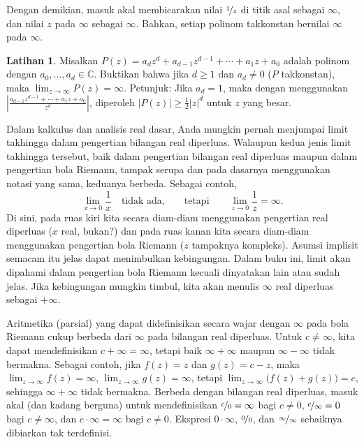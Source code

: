 \documentclass[12pt,openany]{book}
\newcommand{\sabs}[1]{\lvert {#1} \rvert}
\newcommand{\abs}[1]{\left\lvert {#1} \right\rvert}
\newcommand{\C}{{\mathbb{C}}}
\theoremstyle{plain}
\theoremstyle{remark}
\theoremstyle{definition}
\newenvironment{exbox}{%
    \def\FrameCommand{\vrule width 1pt \relax\hspace{10pt}}%
    \MakeFramed{\advance\hsize-\width\FrameRestore}%
}{%
    \endMakeFramed
}
\theoremstyle{exercise}
\newtheorem{exercise}{Latihan}[section]
\theoremstyle{example}
\begin{document}
Dengan demikian, masuk akal membicarakan nilai $\nicefrac{1}{z}$ di titik asal
sebagai $\infty$, dan nilai $z$ pada $\infty$ sebagai $\infty$.
Bahkan, setiap polinom takkonstan bernilai $\infty$ pada $\infty$.

\begin{exbox}
\begin{exercise}%
\label{exercise:polygoesinf}
Misalkan $P(z) = a_d z^d + a_{d-1} z^{d-1} + \cdots + a_1 z + a_0$ adalah
polinom dengan $a_0,\ldots,a_d \in \C$.  Buktikan bahwa jika $d \geq 1$
dan $a_d \neq 0$ ($P$ takkonstan),
maka $\lim_{z \to \infty} P(z) = \infty$.
Petunjuk: Jika $a_d = 1$, maka dengan menggunakan
$\abs{\frac{a_{d-1} z^{d-1} + \cdots + a_1 z + a_0}{z^d}}$, diperoleh
$\abs{P(z)} \geq \frac{1}{2} \sabs{z}^d$ untuk $z$ yang besar.
\end{exercise}
\end{exbox}

Dalam kalkulus dan analisis real dasar, Anda mungkin pernah menjumpai
limit takhingga dalam pengertian bilangan real diperluas.
Walaupun kedua jenis limit takhingga tersebut, baik dalam pengertian
bilangan real diperluas maupun dalam pengertian bola Riemann,
tampak serupa dan pada dasarnya menggunakan notasi yang sama,
keduanya berbeda.
Sebagai contoh,
\begin{equation*}
\lim_{x \to 0} \frac{1}{x} \quad \text{tidak ada,} \qquad \text{tetapi} \qquad
\lim_{z \to 0} \frac{1}{z} = \infty .
\end{equation*}
Di sini, pada ruas kiri kita secara diam-diam menggunakan pengertian real diperluas
($x$ real, bukan?) dan pada
ruas kanan kita secara diam-diam menggunakan pengertian bola Riemann ($z$ tampaknya kompleks).
Asumsi implisit semacam itu jelas dapat menimbulkan kebingungan.
Dalam buku ini, limit akan dipahami dalam pengertian bola Riemann
kecuali dinyatakan lain atau sudah jelas.
Jika kebingungan mungkin timbul, kita akan menulis $\infty$ real diperluas
sebagai $+\infty$.

\medskip

Aritmetika (parsial) yang dapat
didefinisikan secara wajar dengan $\infty$ pada bola Riemann
cukup berbeda dari
$\infty$ pada bilangan real diperluas.
Untuk $c \neq \infty$, kita dapat mendefinisikan $c+\infty = \infty$,
tetapi baik $\infty+\infty$ maupun $\infty-\infty$ tidak bermakna.
Sebagai contoh, jika $f(z) = z$ dan $g(z) = c-z$,
maka $\lim_{z \to \infty} f(z) = \infty$,
$\lim_{z \to \infty} g(z) = \infty$, tetapi $\lim_{z \to \infty}
\bigl(f(z)+g(z)\bigr) = c$, sehingga $\infty+\infty$ tidak bermakna.
Berbeda dengan bilangan real diperluas,
masuk akal (dan kadang berguna) untuk mendefinisikan $\nicefrac{c}{0} = \infty$ bagi
$c \neq 0$, $\nicefrac{c}{\infty} = 0$ bagi $c \neq \infty$,
dan $c \cdot \infty = \infty$ bagi $c \neq 0$.
Ekspresi $0 \cdot \infty$, $\nicefrac{0}{0}$, dan
$\nicefrac{\infty}{\infty}$ sebaiknya dibiarkan tak terdefinisi.
\end{document}
